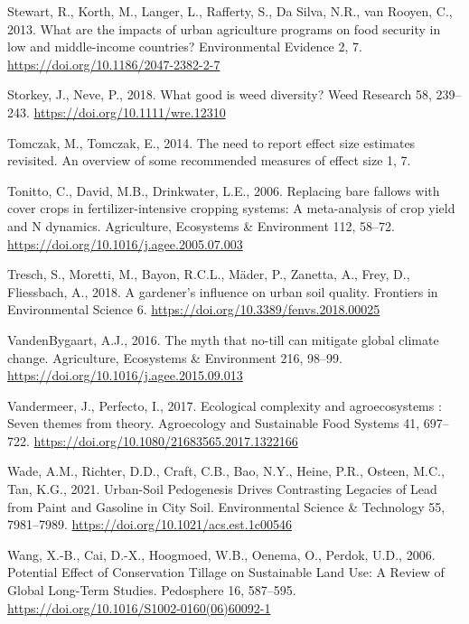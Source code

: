 \documentclass[
  12pt,
]{article}
\newlength{\cslhangindent}
\newlength{\cslentryspacingunit} %
\newenvironment{CSLReferences}[2] %
 {%
  \setlength{\parindent}{0pt}
  \ifodd #1
  \let\oldpar\par
  \def\par{\hangindent=\cslhangindent\oldpar}
  \fi
  \setlength{\parskip}{#2\cslentryspacingunit}
 }%
 {}
\begin{document}
\begin{CSLReferences}{1}{0}
\leavevmode{}%
Stewart, R., Korth, M., Langer, L., Rafferty, S., Da Silva, N.R., van Rooyen, C., 2013. What are the impacts of urban agriculture programs on food security in low and middle-income countries? Environmental Evidence 2, 7. \url{https://doi.org/10.1186/2047-2382-2-7}

\leavevmode{}%
Storkey, J., Neve, P., 2018. What good is weed diversity? Weed Research 58, 239--243. \url{https://doi.org/10.1111/wre.12310}

\leavevmode{}%
Tomczak, M., Tomczak, E., 2014. The need to report effect size estimates revisited. {An} overview of some recommended measures of effect size 1, 7.

\leavevmode{}%
Tonitto, C., David, M.B., Drinkwater, L.E., 2006. Replacing bare fallows with cover crops in fertilizer-intensive cropping systems: {A} meta-analysis of crop yield and {N} dynamics. Agriculture, Ecosystems \& Environment 112, 58--72. \url{https://doi.org/10.1016/j.agee.2005.07.003}

\leavevmode{}%
Tresch, S., Moretti, M., Bayon, R.C.L., Mäder, P., Zanetta, A., Frey, D., Fliessbach, A., 2018. A gardener's influence on urban soil quality. Frontiers in Environmental Science 6. \url{https://doi.org/10.3389/fenvs.2018.00025}

\leavevmode{}%
VandenBygaart, A.J., 2016. The myth that no-till can mitigate global climate change. Agriculture, Ecosystems \& Environment 216, 98--99. \url{https://doi.org/10.1016/j.agee.2015.09.013}

\leavevmode{}%
Vandermeer, J., Perfecto, I., 2017. Ecological complexity and agroecosystems : Seven themes from theory. Agroecology and Sustainable Food Systems 41, 697--722. \url{https://doi.org/10.1080/21683565.2017.1322166}

\leavevmode{}%
Wade, A.M., Richter, D.D., Craft, C.B., Bao, N.Y., Heine, P.R., Osteen, M.C., Tan, K.G., 2021. Urban-{Soil Pedogenesis Drives Contrasting Legacies} of {Lead} from {Paint} and {Gasoline} in {City Soil}. Environmental Science \& Technology 55, 7981--7989. \url{https://doi.org/10.1021/acs.est.1c00546}

\leavevmode{}%
Wang, X.-B., Cai, D.-X., Hoogmoed, W.B., Oenema, O., Perdok, U.D., 2006. Potential {Effect} of {Conservation Tillage} on {Sustainable Land Use}: {A Review} of {Global Long-Term Studies}. Pedosphere 16, 587--595. \url{https://doi.org/10.1016/S1002-0160(06)60092-1}


\end{CSLReferences}
\end{document}
